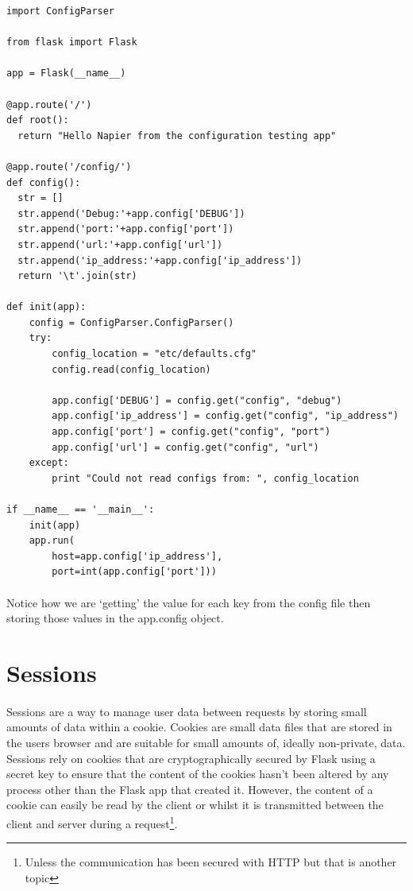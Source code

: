 \documentclass[12pt, a4paper, twoside]{book}
\begin{document}
\begin{lstlisting}
import ConfigParser

from flask import Flask

app = Flask(__name__)

@app.route('/')
def root():
  return "Hello Napier from the configuration testing app"

@app.route('/config/')
def config():
  str = []
  str.append('Debug:'+app.config['DEBUG'])
  str.append('port:'+app.config['port'])
  str.append('url:'+app.config['url'])
  str.append('ip_address:'+app.config['ip_address'])
  return '\t'.join(str)

def init(app):
    config = ConfigParser.ConfigParser()
    try:
        config_location = "etc/defaults.cfg"
        config.read(config_location)
        
        app.config['DEBUG'] = config.get("config", "debug")
        app.config['ip_address'] = config.get("config", "ip_address")
        app.config['port'] = config.get("config", "port")
        app.config['url'] = config.get("config", "url")
    except:
        print "Could not read configs from: ", config_location

if __name__ == '__main__':
    init(app)
    app.run(
        host=app.config['ip_address'], 
        port=int(app.config['port']))
\end{lstlisting}

\paragraph{}  Notice how we are `getting' the value for each key from the config file then storing those values in the app.config object. 

\section{Sessions}
\label{sessions}
\paragraph{} Sessions are a way to manage user data between requests by storing small amounts of data within a cookie. Cookies are small data files that are stored in the users browser and are suitable for small amounts of, ideally non-private, data. Sessions rely on cookies that are cryptographically secured by Flask using a secret key to ensure that the content of the cookies hasn't been altered by any process other than the Flask app that created it. However, the content of a cookie can easily be read by the client or whilst it is transmitted between the client and server during a request\footnote{Unless the communication has been secured with HTTP but that is another topic}.
\end{document}
